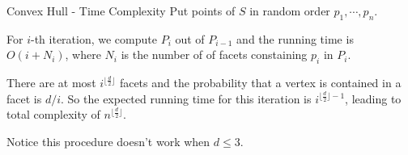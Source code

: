 \documentclass{beamer}
\begin{document}
\begin{frame}{Convex Hull - Time Complexity}
	Put points of $S$ in random order $p_1, \cdots, p_n$.

	\vspace{\baselineskip}

	For $i$-th iteration, we compute $P_i$ out of $P_{i-1}$ and the running time is $O(i + N_i)$, where $N_i$ is the number of
	of facets constaining $p_i$ in $P_i$.

	\vspace{\baselineskip}

	There are at most $i^{\lfloor \frac{d}{2} \rfloor}$ facets and the probability that a vertex is contained in a facet
	is $d / i$. So the expected running time for this iteration is $i^{\lfloor \frac{d}{2} \rfloor - 1}$, leading to total complexity of $n^{\lfloor \frac{d}{2} \rfloor }$.

    Notice this procedure doesn't work when $d \le 3$.
\end{frame}
\end{document}
